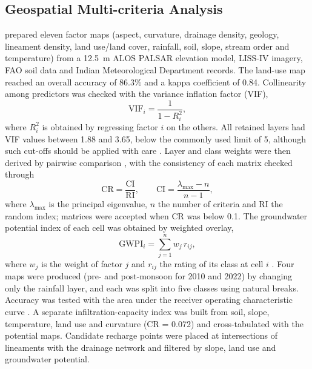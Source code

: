 \documentclass[10pt,a4paper,twocolumn]{article}
\begin{document}
\subsection{Geospatial Multi-criteria Analysis}

\citet{sharma2025} prepared eleven factor maps (aspect, curvature, drainage density, geology,
lineament density, land use/land cover, rainfall, soil, slope, stream order and temperature)
from a 12.5~m ALOS PALSAR elevation model, LISS-IV imagery, FAO soil data and Indian
Meteorological Department records. The land-use map reached an overall accuracy of 86.3\% and a
kappa coefficient of 0.84. Collinearity among predictors was checked with the variance
inflation factor (VIF),
\begin{equation}
\mathrm{VIF}_i=\frac{1}{1-R_i^{2}},
\label{eq:vif}
\end{equation}
where $R_i^2$ is obtained by regressing factor $i$ on the others. All retained layers had VIF
values between 1.88 and 3.65, below the commonly used limit of 5, although such cut-offs should
be applied with care \citep{obrien2007}. Layer and class weights were then derived by pairwise
comparison \citep{saaty1980}, with the consistency of each matrix checked through
\begin{equation}
\mathrm{CR}=\frac{\mathrm{CI}}{\mathrm{RI}},\qquad \mathrm{CI}=\frac{\lambda_{\max}-n}{n-1},
\label{eq:cr}
\end{equation}
where $\lambda_{\max}$ is the principal eigenvalue, $n$ the number of criteria and RI the random
index; matrices were accepted when CR was below 0.1. The groundwater potential index of each
cell was obtained by weighted overlay,
\begin{equation}
\mathrm{GWPI}_i=\sum_{j=1}^{n} w_j\, r_{ij},
\label{eq:gwpi}
\end{equation}
where $w_j$ is the weight of factor $j$ and $r_{ij}$ the rating of its class at cell $i$
\citep{malczewski2006}. Four maps were produced (pre- and post-monsoon for 2010 and 2022) by
changing only the rainfall layer, and each was split into five classes using natural breaks.
Accuracy was tested with the area under the receiver operating characteristic curve
\citep{fawcett2006}. A separate infiltration-capacity index was built from soil, slope,
temperature, land use and curvature (CR = 0.072) and cross-tabulated with the potential maps.
Candidate recharge points were placed at intersections of lineaments with the drainage network
and filtered by slope, land use and groundwater potential.
\end{document}
